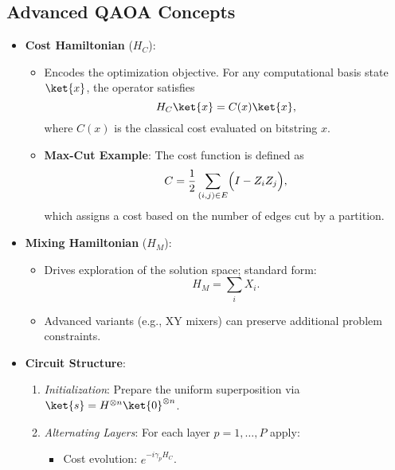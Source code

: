 \begin{multicols}{3}
                  \section*{Advanced QAOA Concepts}
                  \begin{itemize}[leftmargin=*,nosep,topsep=0pt]
                    \item \textbf{Cost Hamiltonian} ($H_C$):
                      \begin{itemize}[nosep]
                        \item Encodes the optimization objective. For any computational basis state \(\ket{x}\), the operator satisfies
                          \[
                            H_C \ket{x} = C(x) \ket{x},
                          \]
                          where \(C(x)\) is the classical cost evaluated on bitstring \(x\).
                        \item \textbf{Max-Cut Example}: The cost function is defined as
                          \[
                            C = \frac{1}{2} \sum_{(i,j) \in E} \Bigl(I - Z_i Z_j\Bigr),
                          \]
                          which assigns a cost based on the number of edges cut by a partition.
                      \end{itemize}
                    \item \textbf{Mixing Hamiltonian} ($H_M$):
                      \begin{itemize}[nosep]
                        \item Drives exploration of the solution space; standard form:
                          \[
                            H_M = \sum_i X_i.
                          \]
                        \item Advanced variants (e.g., XY mixers) can preserve additional problem constraints.
                      \end{itemize}
                    \item \textbf{Circuit Structure}:
                      \begin{enumerate}[nosep]
                        \item \textit{Initialization}: Prepare the uniform superposition via \(\ket{s}=H^{\otimes n}\ket{0}^{\otimes n}\).
                        \item \textit{Alternating Layers}: For each layer \(p=1,\dots,P\) apply:
                          \begin{itemize}[nosep]
                            \item Cost evolution: \(e^{-i\gamma_p H_C}\).

\end{itemize}
\end{enumerate}
\end{itemize}
\end{multicols}

